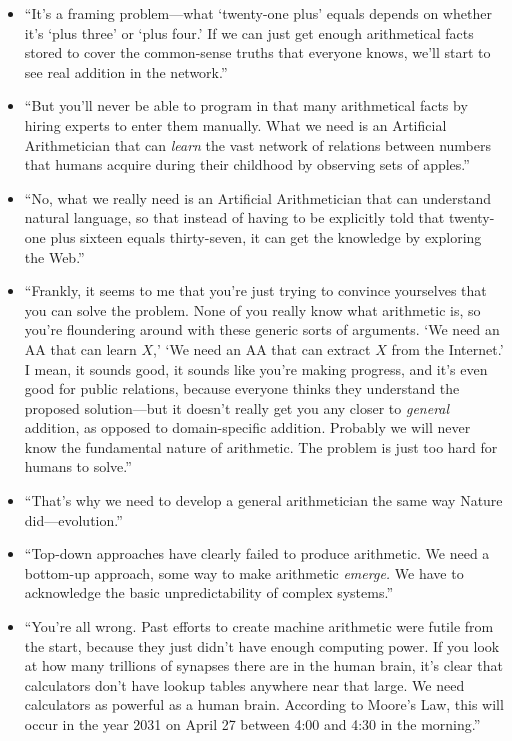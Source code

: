 \begin{itemize}
\item {
 ``It's a framing problem---what
`twenty-one plus' equals depends on
whether it's `plus
three' or `plus four.'
If we can just get enough arithmetical facts stored to cover the
common-sense truths that everyone knows, we'll start to
see real addition in the network.''}

\item {
 ``But you'll never be able to
program in that many arithmetical facts by hiring experts to enter them
manually. What we need is an Artificial Arithmetician that can
\textit{learn} the vast network of relations between numbers that
humans acquire during their childhood by observing sets of
apples.''}

\item {
 ``No, what we really need is an Artificial
Arithmetician that can understand natural language, so that instead of
having to be explicitly told that twenty-one plus sixteen equals
thirty-seven, it can get the knowledge by exploring the
Web.''}

\item {
 ``Frankly, it seems to me that
you're just trying to convince yourselves that you can
solve the problem. None of you really know what arithmetic is, so
you're floundering around with these generic sorts of
arguments. `We need an AA that can learn
$X$,' `We need an AA that can extract $X$
from the Internet.' I mean, it sounds good, it sounds
like you're making progress, and it's
even good for public relations, because everyone thinks they understand
the proposed solution---but it doesn't really get you
any closer to \textit{general} addition, as opposed to domain-specific
addition. Probably we will never know the fundamental nature of
arithmetic. The problem is just too hard for humans to
solve.''}

\item {
 ``That's why we need to develop a
general arithmetician the same way Nature
did---evolution.''}

\item {
 ``Top-down approaches have clearly failed to
produce arithmetic. We need a bottom-up approach, some way to make
arithmetic \textit{emerge.} We have to acknowledge the basic
unpredictability of complex systems.''}

\item {
 ``You're all wrong. Past efforts
to create machine arithmetic were futile from the start, because they
just didn't have enough computing power. If you look at
how many trillions of synapses there are in the human brain,
it's clear that calculators don't have
lookup tables anywhere near that large. We need calculators as powerful
as a human brain. According to Moore's Law, this will
occur in the year 2031 on April 27 between 4:00 and 4:30 in the
morning.''}


\end{itemize}
